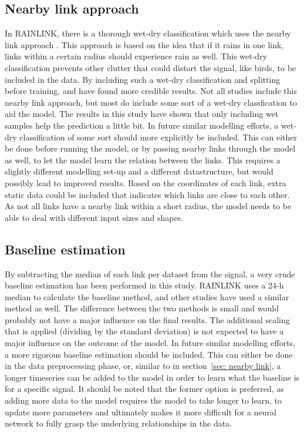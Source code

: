 \documentclass[twocolumn, 10pt, a4paper]{memoir}
\begin{document}
	\subsection*{Nearby link approach} \label{sec: nearby link}
	In RAINLINK, there is a thorough wet-dry classification which uses the nearby link approach \cite{Overeem2011}. This approach is based on the idea that if it rains in one link, links within a certain radius should experience rain as well. This wet-dry classification prevents other clutter that could distort the signal, like birds, to be included in the data. By including such a wet-dry classification and splitting before training,  and  have found more credible results.
	Not all studies include this nearby link approach, but most do include some sort of a wet-dry classfication to aid the model. The results in this study have shown that only including wet samples help the prediction a little bit. In future similar modelling efforts, a wet-dry classification of some sort should more explicitly be included. This can either be done before running the model, or by passing nearby links through the model as well, to let the model learn the relation between the links. This requires a slightly different modelling set-up and a different datastructure, but would possibly lead to improved results. Based on the coordinates of each link, extra static data could be included that indicates which links are close to each other. As not all links have a nearby link within a short radius, the model needs to be able to deal with different input sizes and shapes.
	
	\subsection*{Baseline estimation} \label{sec: baseline}
	By subtracting the median of each link per dataset from the signal, a very crude baseline estimation has been performed in this study. RAINLINK uses a 24-h median to calculate the baseline method, and other studies \cite{Habi2019} have used a similar method as well. The difference between the two methods is small and would probably not have a major influence on the final results. The additional scaling that is applied (dividing by the standard deviation) is not expected to have a major influence on the outcome of the model. In future similar modelling efforts, a more rigorous baseline estimation should be included. This can either be done in the data preprocessing phase, or, similar to in section~\ref{sec: nearby link}, a longer timeseries can be added to the model in order to learn what the baseline is for a specific signal. It should be noted that the former option is preferred, as adding more data to the model requires the model to take longer to learn, to update more parameters and ultimately makes it more difficult for a neural network to fully grasp the underlying relationships in the data. 
	
\end{document}
